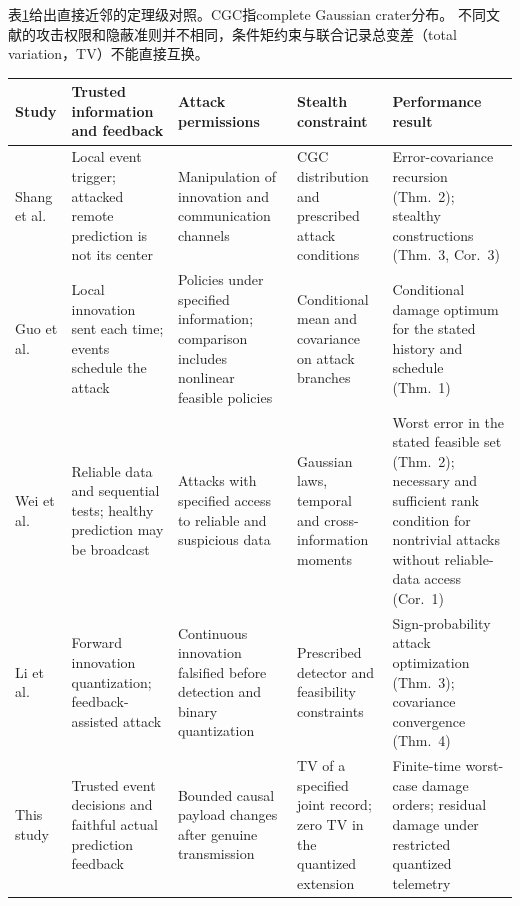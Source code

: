 表\ref{tab:related}给出直接近邻的定理级对照。CGC指complete Gaussian crater分布\cite{shang2022}。
不同文献的攻击权限和隐蔽准则并不相同，条件矩约束与联合记录总变差（total variation，TV）不能直接互换。
\begin{table}[ht]
\centering\footnotesize
{}
\label{tab:related}
\begin{tabularx}{\linewidth}{>{\raggedright\arraybackslash}p{1.55cm}*{4}{>{\raggedright\arraybackslash}X}}
\toprule
Study & Trusted information and feedback & Attack permissions & Stealth constraint & Performance result\\
\midrule
Shang et al.\cite{shang2022} &
Local event trigger; attacked remote prediction is not its center &
Manipulation of innovation and communication channels &
CGC distribution and prescribed attack conditions &
Error-covariance recursion (Thm.~2); stealthy constructions (Thm.~3, Cor.~3)\\
Guo et al.\cite{guo2025} &
Local innovation sent each time; events schedule the attack &
Policies under specified information; comparison includes nonlinear feasible policies &
Conditional mean and covariance on attack branches &
Conditional damage optimum for the stated history and schedule (Thm.~1)\\
Wei et al.\cite{wei2026} &
Reliable data and sequential tests; healthy prediction may be broadcast &
Attacks with specified access to reliable and suspicious data &
Gaussian laws, temporal and cross-information moments &
Worst error in the stated feasible set (Thm.~2); necessary and sufficient rank condition for nontrivial attacks without reliable-data access (Cor.~1)\\
Li et al.\cite{li2026} &
Forward innovation quantization; feedback-assisted attack &
Continuous innovation falsified before detection and binary quantization &
Prescribed detector and feasibility constraints &
Sign-probability attack optimization (Thm.~3); covariance convergence (Thm.~4)\\
This study &
Trusted event decisions and faithful actual prediction feedback &
Bounded causal payload changes after genuine transmission &
TV of a specified joint record; zero TV in the quantized extension &
Finite-time worst-case damage orders; residual damage under restricted quantized telemetry\\
\bottomrule
\end{tabularx}
\end{table}

